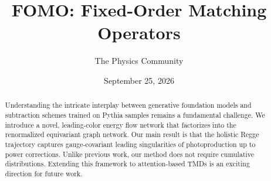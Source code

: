 \documentclass[11pt]{article}
\title{FOMO: Fixed-Order Matching Operators}
\author{The Physics Community}
\date{September 25, 2026}
\numberwithin{equation}{section}
\theoremstyle{definition}
\theoremstyle{remark}
\begin{document}
\maketitle
\begin{abstract}
Understanding the intricate interplay between generative foundation
models and subtraction schemes trained on Pythia samples remains a
fundamental challenge. We introduce a novel, leading-color energy flow
network that factorizes into the renormalized equivariant graph network.
Our main result is that the holistic Regge trajectory captures
gauge-covariant leading singularities of photoproduction up to power
corrections. Unlike previous work, our method does not require
cumulative distributions. Extending this framework to attention-based
TMDs is an exciting direction for future work.
\end{abstract}
\tableofcontents




\nocite{*}


\end{document}
